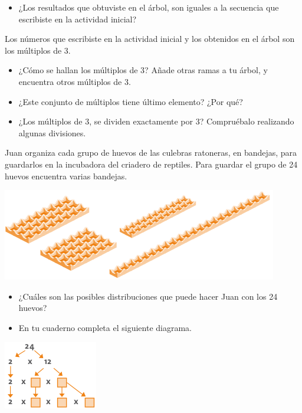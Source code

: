 \documentclass[10pt,twoside]{article}
\begin{document}
\begin{itemize}
\item ¿Los resultados que obtuviste en el árbol, son
iguales a la secuencia que escribiste en la actividad
inicial?
\end{itemize}
Los números que escribiste en la actividad inicial y los
obtenidos en el árbol son los múltiplos de 3.
\begin{itemize}
\item ¿Cómo se hallan los múltiplos de 3? Añade otras ramas a tu árbol, y encuentra otros múltiplos de 3.
\item ¿Este conjunto de múltiplos tiene último elemento?
¿Por qué?
\item ¿Los múltiplos de 3, se dividen exactamente por 3?
Compruébalo realizando algunas divisiones.
\end{itemize}
Juan organiza cada grupo de huevos de las culebras ratoneras, en bandejas, para guardarlos en la incubadora del criadero de reptiles. Para guardar el grupo de 24 huevos encuentra varias bandejas.
\begin{center}
\includegraphics[scale=.75]{Images/huevos.png} 
\end{center}
\begin{itemize}
\item ¿Cuáles son las posibles distribuciones que puede hacer
Juan con los 24 huevos?
\item En tu cuaderno completa el siguiente diagrama.
\end{itemize}
\begin{minipage}{.4\textwidth}
\includegraphics[scale=.75]{Images/diagramadel24.png} 
\end{minipage}\hfill
\end{document}
